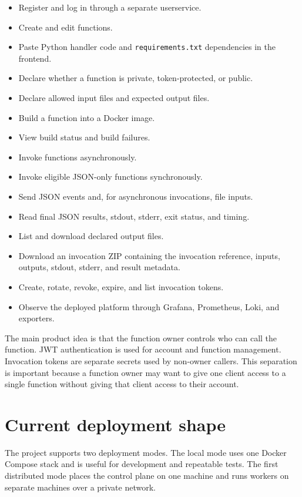 \documentclass[12pt,a4paper]{report}
\newcommand{\file}[1]{\texttt{#1}}
\begin{document}
\begin{itemize}[leftmargin=1.2cm]
  \item Register and log in through a separate userservice.
  \item Create and edit functions.
  \item Paste Python handler code and \file{requirements.txt} dependencies in the frontend.
  \item Declare whether a function is private, token-protected, or public.
  \item Declare allowed input files and expected output files.
  \item Build a function into a Docker image.
  \item View build status and build failures.
  \item Invoke functions asynchronously.
  \item Invoke eligible JSON-only functions synchronously.
  \item Send JSON events and, for asynchronous invocations, file inputs.
  \item Read final JSON results, stdout, stderr, exit status, and timing.
  \item List and download declared output files.
  \item Download an invocation ZIP containing the invocation reference, inputs, outputs, stdout, stderr, and result metadata.
  \item Create, rotate, revoke, expire, and list invocation tokens.
  \item Observe the deployed platform through Grafana, Prometheus, Loki, and exporters.
\end{itemize}

The main product idea is that the function owner controls who can call the
function. JWT authentication is used for account and function management.
Invocation tokens are separate secrets used by non-owner callers. This
separation is important because a function owner may want to give one client
access to a single function without giving that client access to their account.

\section{Current deployment shape}

The project supports two deployment modes. The local mode uses one Docker
Compose stack and is useful for development and repeatable tests. The first
distributed mode places the control plane on one machine and runs workers on
separate machines over a private network.
\end{document}

